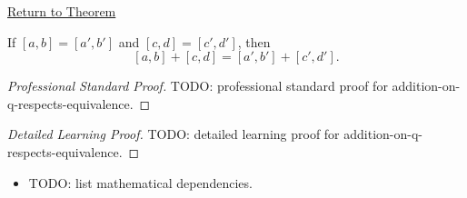 \newpage
{}
\label{prf:addition-on-q-respects-equivalence}

\begin{remark*}[Return]
\hyperref[lem:addition-on-q-respects-equivalence]{Return to Theorem}
\end{remark*}

\begin{lemma*}
If $[a,b]=[a',b']$ and $[c,d]=[c',d']$, then
\[
[a,b]+[c,d]=[a',b']+[c',d'].
\]
\end{lemma*}

\begin{proof}[Professional Standard Proof]
\LRAProofBodyStart
TODO: professional standard proof for addition-on-q-respects-equivalence.
\end{proof}

\begin{proof}[Detailed Learning Proof]
\LRAProofBodyStart
TODO: detailed learning proof for addition-on-q-respects-equivalence.
\end{proof}

\begin{remark*}
\end{remark*}

\begin{dependencies}
\begin{itemize}
  \item TODO: list mathematical dependencies.
\end{itemize}
\end{dependencies}

\clearpage

